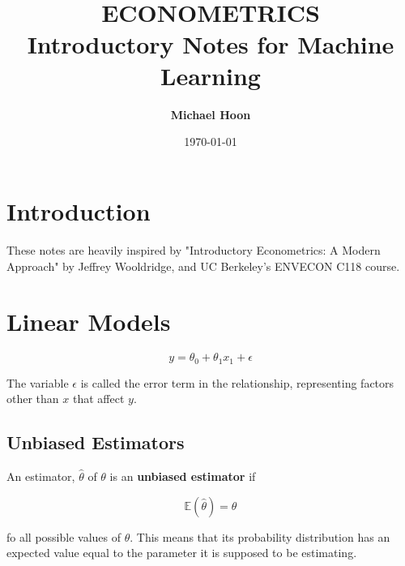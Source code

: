\documentclass{article}
\begin{document}

\title{ \normalsize \textsc{}
		\\ [2.0cm]
		\HRule{1.5pt} \\
		\LARGE \textbf{\uppercase{Econometrics}
		\HRule{2.0pt} \\ [0.6cm] \LARGE{Introductory Notes for Machine Learning} \vspace*{10\baselineskip}}
		}
\date{\today}
\author{\textbf{Michael Hoon}}

\maketitle
\newpage

\tableofcontents
\newpage



\section{Introduction}
These notes are heavily inspired by "Introductory Econometrics: A Modern Approach" by Jeffrey Wooldridge, and UC Berkeley's ENVECON C118 course. 

\section{Linear Models}

\begin{equation}
    y = \theta_0 + \theta_1 x_{1} + \epsilon
\end{equation}

\noindent The variable $\epsilon$ is called the error term in the relationship, representing factors other than $x$ that affect $y$. 

\subsection{Unbiased Estimators}
An estimator, $\hat{\theta}$ of $\theta$ is an \textbf{unbiased estimator} if 

\begin{equation}
    \mathbb{E}(\hat{\theta}) = \theta
\end{equation}

\noindent fo all possible values of $\theta$. This means that its probability distribution has an expected value equal to the parameter it is supposed to be estimating. 
\end{document}
